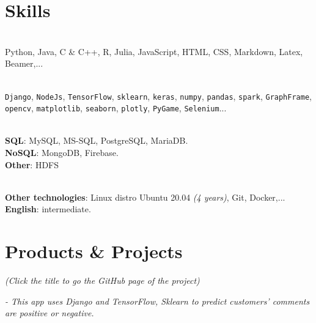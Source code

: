 \documentclass[a4paper,10pt]{article}
\begin{document}
\begin{adjustbox}{valign=t}
\begin{minipage}{0.6\textwidth} %
\section*{Skills}
\begin{description}
\raggedright
\item[\normalfont \textcolor{ColorOne}{Programming and Markup Languages}] \textbf{}\\ \medskip Python, Java, C \& C++, R, Julia, JavaScript, HTML, CSS, Markdown, Latex, Beamer,...\\

\item[\normalfont \textcolor{ColorOne}{Frameworks \& Libraries}] \textbf{}\\ \medskip \texttt{Django}, \texttt{NodeJs}, \texttt{TensorFlow}, \texttt{sklearn}, \texttt{keras}, \texttt{numpy}, \texttt{pandas}, \texttt{spark}, \texttt{GraphFrame}, \texttt{opencv}, \texttt{matplotlib}, \texttt{seaborn}, \texttt{plotly}, \texttt{PyGame}, \texttt{Selenium}...\\

\item[\normalfont \textcolor{ColorOne}{Database}] \textbf{}\\ \medskip
\textbf{SQL}: MySQL, MS-SQL, PostgreSQL, MariaDB.\\
\textbf{NoSQL}: MongoDB, Firebase.\\
\textbf{Other}: HDFS\\

\item[\normalfont \textcolor{ColorOne}{Others}] \textbf{}\\ \medskip
\textbf{Other technologies}: Linux distro Ubuntu 20.04 \textit{(4 years)}, Git, Docker,...\\
\textbf{English}: intermediate.

\end{description}

\section*{Products \& Projects} \small{\textit{(Click the title to go the GitHub page of the project)}}
\begin{description}
\raggedright
\item[{\textbf{\textcolor{ColorOne}{\myhref{https://github.com/cuongpiger/SCL_KHVW_Sentiment_Analysis_Project}{Shopee fashion - Sentiment Analysis model}}}}] 
\textit{- This app uses Django and TensorFlow, Sklearn to predict customers' comments are positive or negative.}\\ \medskip 


\end{description}
\end{minipage}
\end{adjustbox}
\end{document}
